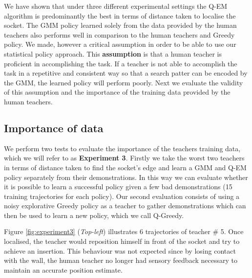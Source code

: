 \documentclass[final,3p,times,twocolumn]{elsarticle}
\begin{document}
We have shown that under three different experimental settings the Q-EM algorithm is predominantly the best in terms of distance taken 
to localise the socket. The GMM policy learned solely from the data provided by the human teachers also performs well in comparison to  
the human teachers and Greedy policy. We made, however a critical assumption in order to be able to use our statistical policy approach. 
This \textbf{assumption} is that a human teacher is proficient in accomplishing the task. If a teacher is not able to accomplish 
the task in a repetitive and consistent way so that a search patter can be encoded by the GMM, the learned policy will perform poorly.
Next we evaluate the validity of this assumption and the importance of the training data provided by the human teachers.
 
\subsection{Importance of data}

We perform two tests to evaluate the importance of the teachers training data, which we will refer to as \textbf{Experiment 3}.
Firstly we take the worst two teachers in terms of distance taken to find the socket's edge and learn a GMM and Q-EM policy separately from their 
demonstrations. In this way we can evaluate whether it is possible to learn a successful policy given 
a few bad demonstrations (15 training trajectories for each policy). Our second evaluation consists of using a noisy 
explorative Greedy policy as a teacher to gather demonstrations which can then be used to learn a new policy, which we call Q-Greedy. 

Figure \ref{fig:experiment3} (\textit{Top-left}) illustrates 6 trajectories of teacher \# 5. Once localised, the teacher 
would reposition himself in front of the socket and try to achieve an insertion. This behaviour was not expected 
since by losing contact with the wall, the human teacher no longer had sensory feedback necessary 
to maintain an accurate position estimate.
\end{document}
